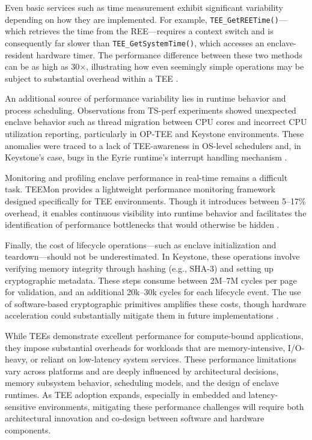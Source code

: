 Even basic services such as time measurement exhibit significant variability depending on how they are implemented. For example, \texttt{TEE\_GetREETime()}—which retrieves the time from the REE—requires a context switch and is consequently far slower than \texttt{TEE\_GetSystemTime()}, which accesses an enclave-resident hardware timer. The performance difference between these two methods can be as high as 30×, illustrating how even seemingly simple operations may be subject to substantial overhead within a TEE \cite{suzaki2021tsperf}.

An additional source of performance variability lies in runtime behavior and process scheduling. Observations from TS-perf experiments showed unexpected enclave behavior such as thread migration between CPU cores and incorrect CPU utilization reporting, particularly in OP-TEE and Keystone environments. These anomalies were traced to a lack of TEE-awareness in OS-level schedulers and, in Keystone's case, bugs in the Eyrie runtime's interrupt handling mechanism \cite{suzaki2021tsperf}.

Monitoring and profiling enclave performance in real-time remains a difficult task. TEEMon provides a lightweight performance monitoring framework designed specifically for TEE environments. Though it introduces between 5–17\% overhead, it enables continuous visibility into runtime behavior and facilitates the identification of performance bottlenecks that would otherwise be hidden \cite{krahn2020teemon}.

Finally, the cost of lifecycle operations—such as enclave initialization and teardown—should not be underestimated. In Keystone, these operations involve verifying memory integrity through hashing (e.g., SHA-3) and setting up cryptographic metadata. These steps consume between 2M–7M cycles per page for validation, and an additional 20k–30k cycles for each lifecycle event. The use of software-based cryptographic primitives amplifies these costs, though hardware acceleration could substantially mitigate them in future implementations \cite{Lee2019}.

While TEEs demonstrate excellent performance for compute-bound applications, they impose substantial overheads for workloads that are memory-intensive, I/O-heavy, or reliant on low-latency system services. These performance limitations vary across platforms and are deeply influenced by architectural decisions, memory subsystem behavior, scheduling models, and the design of enclave runtimes. As TEE adoption expands, especially in embedded and latency-sensitive environments, mitigating these performance challenges will require both architectural innovation and co-design between software and hardware components.


